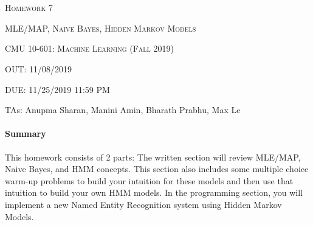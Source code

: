 \documentclass{article}
\begin{document}
\section*{}
\begin{center}
  \centerline{\textsc{\LARGE Homework 7}}
  \vspace{0.5em}
  \centerline{\textsc{\LARGE MLE/MAP, Naive Bayes, Hidden Markov Models}}
  \vspace{1em}
  \textsc{\large CMU 10-601: Machine Learning (Fall 2019)} \\
  \url{}
  \centerline{OUT: 11/08/2019}
  \centerline{DUE: 11/25/2019 11:59 PM}
    \centerline{TAs: Anupma Sharan, Manini Amin, Bharath Prabhu, Max Le}
\end{center}

\begin{notebox}
\paragraph{Summary} This homework consists of 2 parts: The written section will review MLE/MAP, Naive Bayes, and HMM concepts. This section also includes some multiple choice warm-up problems to build your intuition for these models and then use that intuition to build your own HMM models. In the programming section, you will implement a new Named Entity Recognition system using Hidden Markov Models.
\end{notebox}
\end{document}
